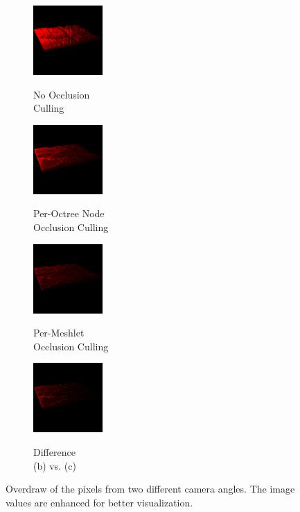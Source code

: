 \begin{figure}[!htb]
  \begin{subfigure}{100px}
    \includegraphics[height=100px]{images/graphics/overdraw-terrain2-nocull.png}
    \caption{}
    \parbox{\linewidth}{\centering\footnotesize No Occlusion\\Culling}
  \end{subfigure}
  \begin{subfigure}{100px}
    \includegraphics[height=100px]{images/graphics/overdraw-terrain2-pooc.png}
    \caption{}
    \parbox{\linewidth}{\centering\footnotesize Per-Octree Node\\Occlusion Culling}
  \end{subfigure}
  \begin{subfigure}{100px}
    \includegraphics[height=100px]{images/graphics/overdraw-terrain2-pmoc.png}
    \caption{}
    \parbox{\linewidth}{\centering\footnotesize Per-Meshlet\\Occlusion Culling}
  \end{subfigure}
  \begin{subfigure}{100px}
    \includegraphics[height=100px]{images/graphics/overdraw-terrain2-diff.png}
    \caption{}
    \parbox{\linewidth}{\centering\footnotesize Difference\\(b) vs. (c)}
  \end{subfigure}

  \caption{Overdraw of the pixels from two different camera angles. 
  The image values are enhanced for better visualization.}
  \label{fig:terrain-overdraw}
\end{figure}


